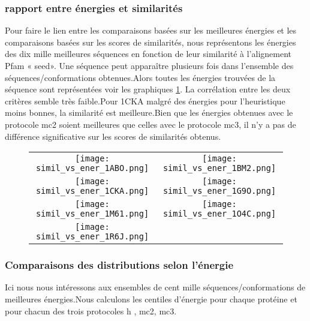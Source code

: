          \subsubsection{rapport entre énergies et  similarités}
Pour faire le lien entre les comparaisons basées sur les meilleures énergies et les comparaisons basées sur les scores de similarités, nous représentons les énergies des dix mille meilleures séquences en fonction de leur similarité à l'alignement Pfam « seed». Une séquence peut apparaître plusieurs fois dans l'ensemble des séquences/conformations obtenues.Alors toutes les énergies trouvées de la séquence sont représentées voir les graphiques \ref{graph:simil_vs_ener}. La corrélation entre les deux critères semble très faible.Pour 1CKA malgré des énergies pour l'heuristique moins bonnes, la similarité est meilleure.Bien que les énergies obtenues avec le protocole mc2 soient meilleures que celles avec le protocole mc3, il n'y a pas de différence significative sur les scores de similarités obtenus.

   \begin{figure}[t]
     \centering
     \begin{tabular}{cc}
       \texttt{[image: simil\_vs\_ener\_1ABO.png]} &
       \texttt{[image: simil\_vs\_ener\_1BM2.png]} \\
       \texttt{[image: simil\_vs\_ener\_1CKA.png]} &
       \texttt{[image: simil\_vs\_ener\_1G9O.png]} \\
       \texttt{[image: simil\_vs\_ener\_1M61.png]} &
       \texttt{[image: simil\_vs\_ener\_1O4C.png]} \\
       \texttt{[image: simil\_vs\_ener\_1R6J.png]} \\
     \end{tabular}
     
     \caption{}
\label{graph:simil_vs_ener}
   \end{figure}
 

         \subsubsection{Comparaisons des distributions selon l'énergie}

Ici nous nous intéressons aux ensembles de cent mille séquences/conformations de meilleures énergies.Nous calculons les centiles d'énergie pour chaque protéine et pour chacun des trois protocoles h , mc2, mc3.  

